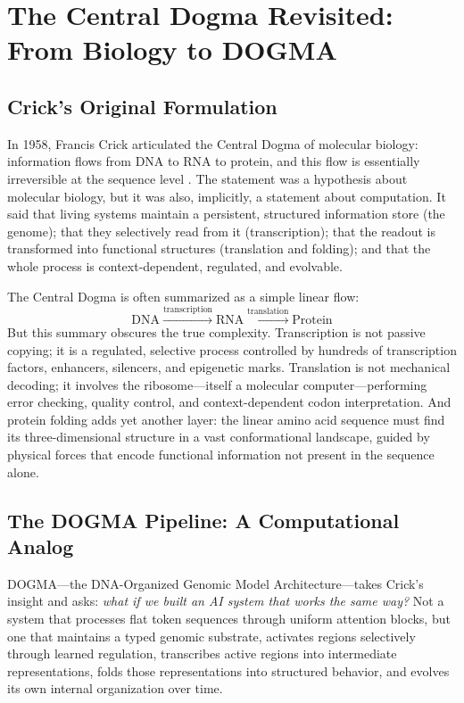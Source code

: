 \section{The Central Dogma Revisited: From Biology to DOGMA}
\label{sec:central-dogma-revisited}

\subsection{Crick's Original Formulation}

In 1958, Francis Crick articulated the Central Dogma of molecular biology: information flows from DNA to RNA to protein, and this flow is essentially irreversible at the sequence level \citep{crick1958}. The statement was a hypothesis about molecular biology, but it was also, implicitly, a statement about computation. It said that living systems maintain a persistent, structured information store (the genome); that they selectively read from it (transcription); that the readout is transformed into functional structures (translation and folding); and that the whole process is context-dependent, regulated, and evolvable.

The Central Dogma is often summarized as a simple linear flow:
\[
\text{DNA} \xrightarrow{\text{transcription}} \text{RNA} \xrightarrow{\text{translation}} \text{Protein}
\]
But this summary obscures the true complexity. Transcription is not passive copying; it is a regulated, selective process controlled by hundreds of transcription factors, enhancers, silencers, and epigenetic marks. Translation is not mechanical decoding; it involves the ribosome---itself a molecular computer---performing error checking, quality control, and context-dependent codon interpretation. And protein folding adds yet another layer: the linear amino acid sequence must find its three-dimensional structure in a vast conformational landscape, guided by physical forces that encode functional information not present in the sequence alone.

\subsection{The DOGMA Pipeline: A Computational Analog}

DOGMA---the DNA-Organized Genomic Model Architecture---takes Crick's insight and asks: \emph{what if we built an AI system that works the same way?} Not a system that processes flat token sequences through uniform attention blocks, but one that maintains a typed genomic substrate, activates regions selectively through learned regulation, transcribes active regions into intermediate representations, folds those representations into structured behavior, and evolves its own internal organization over time.

